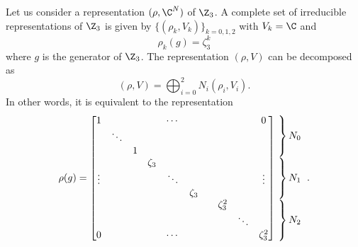 \documentclass{worksheetclass}
\begin{document}
            Let us consider a representation $(\rho,\C^N)$ of $\Z_3$. A complete set of irreducible representations of $\Z_3$ is given by $\{(\rho_k,V_k)\}_{k=0,1,2}$ with $V_k=\C$ and
            \begin{equation}
                \rho_k(g)=\zeta^k_3
            \end{equation}
            where $g$ is the generator of $\Z_3$. The representation $(\rho,V)$ can be decomposed as
            \begin{equation}
                (\rho,V)=\bigoplus^{2}_{i=0}N_i(\rho_i,V_i).
            \end{equation}
            In other words, it is equivalent to the representation
            \begin{equation}
                \rho(g)=
                \begin{bmatrix}
                    1 & & & & \cdots & & & & & 0 \\
                    & \ddots & & & & & & & & \\
                    & & 1 & & & & & & & \\
                    & & & \zeta_3 & & & & & & \\
                    \vdots & & & & \ddots & & & & & \vdots \\
                    & & & & & \zeta_3 & & & & \\
                    & & & & & & & \zeta^2_3 & & \\
                    & & & & & & & & \ddots & \\
                    0 & & & & \cdots & & & & & \zeta^2_3 \\
                \end{bmatrix}
                \hspace{-0.2cm}
                \begin{tabular}{l}
                $\left.\lefteqn{\phantom{
                    \begin{matrix}
                        a_0\\ \ddots\\ a_0\ 
                    \end{matrix} 
                }}\right\}N_0$\\
                $\left.\lefteqn{\phantom{
                    \begin{matrix}
                        a_0\\ \ddots\\ a_0\ 
                    \end{matrix} 
                }}\right\}N_1$\\
                $\left.\lefteqn{\phantom{
                    \begin{matrix}
                        b_0\\ \ddots\\ b_0\ 
                    \end{matrix}
                }} \right\}N_2$
                \end{tabular}.\label{eq:reprrhoZn}
            \end{equation}
\end{document}
